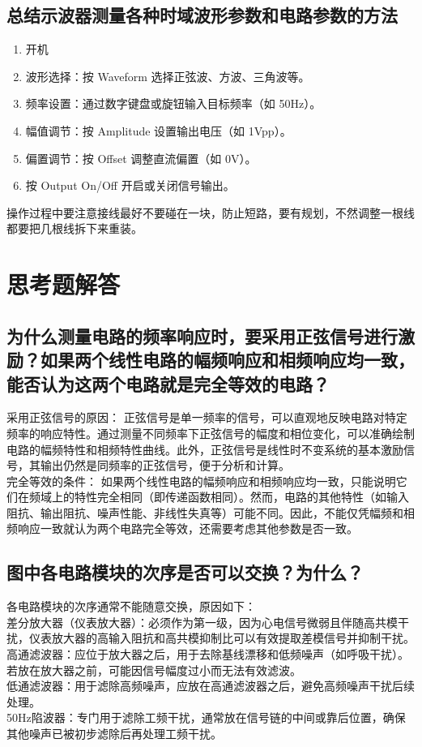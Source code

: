 \documentclass{article}
\begin{document}
\subsection{总结示波器测量各种时域波形参数和电路参数的方法}
\begin{enumerate}
    \item 开机
    \item 波形选择：按 Waveform 选择正弦波、方波、三角波等。
    \item 频率设置：通过数字键盘或旋钮输入目标频率（如 50Hz）。
    \item 幅值调节：按 Amplitude 设置输出电压（如 1Vpp）。
    \item 偏置调节：按 Offset 调整直流偏置（如 0V）。
    \item 按 Output On/Off 开启或关闭信号输出。
\end{enumerate}
操作过程中要注意接线最好不要碰在一块，防止短路，要有规划，不然调整一根线都要把几根线拆下来重装。

\section{思考题解答}
\subsection{为什么测量电路的频率响应时，要采用正弦信号进行激励？如果两个线性电路的幅频响应和相频响应均一致，能否认为这两个电路就是完全等效的电路？}
采用正弦信号的原因：
正弦信号是单一频率的信号，可以直观地反映电路对特定频率的响应特性。通过测量不同频率下正弦信号的幅度和相位变化，可以准确绘制电路的幅频特性和相频特性曲线。此外，正弦信号是线性时不变系统的基本激励信号，其输出仍然是同频率的正弦信号，便于分析和计算。
\\
完全等效的条件：
如果两个线性电路的幅频响应和相频响应均一致，只能说明它们在频域上的特性完全相同（即传递函数相同）。然而，电路的其他特性（如输入阻抗、输出阻抗、噪声性能、非线性失真等）可能不同。因此，不能仅凭幅频和相频响应一致就认为两个电路完全等效，还需要考虑其他参数是否一致。
\subsection{图中各电路模块的次序是否可以交换？为什么？}
各电路模块的次序通常不能随意交换，原因如下：
\\
差分放大器（仪表放大器）：必须作为第一级，因为心电信号微弱且伴随高共模干扰，仪表放大器的高输入阻抗和高共模抑制比可以有效提取差模信号并抑制干扰。
\\
高通滤波器：应位于放大器之后，用于去除基线漂移和低频噪声（如呼吸干扰）。若放在放大器之前，可能因信号幅度过小而无法有效滤波。
\\
低通滤波器：用于滤除高频噪声，应放在高通滤波器之后，避免高频噪声干扰后续处理。
\\
50Hz陷波器：专门用于滤除工频干扰，通常放在信号链的中间或靠后位置，确保其他噪声已被初步滤除后再处理工频干扰。
\end{document}
